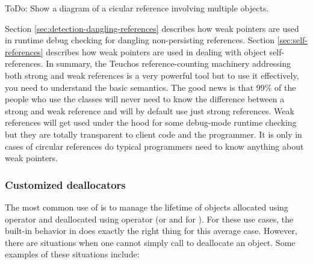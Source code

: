 \documentclass[pdf,ps2pdf,11pt]{SANDreport}
\begin{document}
ToDo: Show a diagram of a cicular reference involving multiple
objects.

Section {}\ref{sec:detection-dangling-references} describes how weak
pointers are used in runtime debug checking for dangling
non-persisting references.  Section {}\ref{sec:self-references}
describes how weak pointers are used in dealing with object
self-references.  In summary, the Teuchos reference-counting machinery
addressing both strong and weak references is a very powerful tool but
to use it effectively, you need to understand the basic semantics.
The good news is that 99\% of the people who use the classes
{} will never need to know the difference between a
strong and weak reference and will by default use just strong
references.  Weak references will get used under the hood for some
debug-mode runtime checking but they are totally transparent to client
code and the programmer.  It is only in cases of circular references
do typical programmers need to know anything about weak pointers.


%
{}\subsubsection{Customized deallocators}
\label{sec:deallocators}
%

The most common use of {} is to manage the lifetime of
objects allocated using operator {} and deallocated using
operator {} (or {} and {} for {}).  For these use cases, the built-in
behavior in {} does exactly the right thing for this
average case.  However, there are situations when one cannot simply
call {} to deallocate an object.  Some examples of
these situations include:
\end{document}
